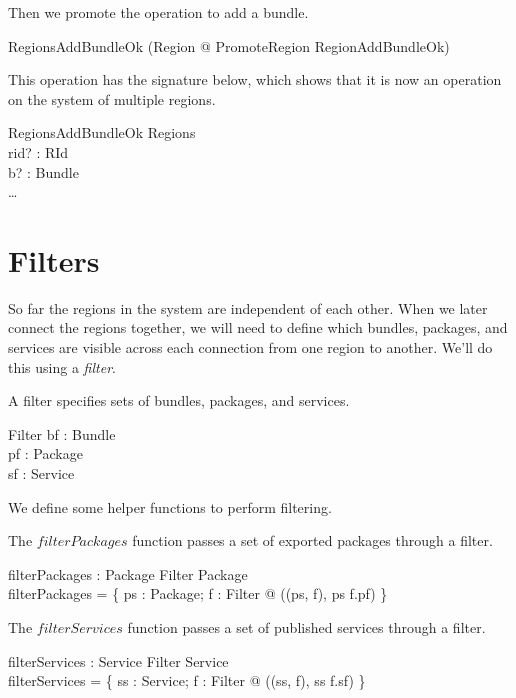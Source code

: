 \documentclass[a4paper,9pt]{article}
\begin{document}
Then we promote the operation to add a bundle.
\begin{zed}
  RegionsAddBundleOk  (\exists \Delta Region @ PromoteRegion \land RegionAddBundleOk) \\
\end{zed}

This operation has the signature below, which shows that it is now an operation on the
system of multiple regions.
\begin{schema}{RegionsAddBundleOk}
  \Delta Regions \\
  rid? : RId \\
  b? : Bundle \\
\where
  \ldots
\end{schema}

\clearpage
\section{Filters}
\label{cha:filters}

So far the regions in the system are independent of each other.
When we later connect the regions together, we will need to define which bundles,
packages, and services are visible across each connection from one region to another.
We'll do this using a \textit{filter}.

A filter specifies sets of bundles, packages, and services.
\begin{schema}{Filter}
  bf : \power Bundle \\
  pf : \power Package \\
  sf : \power Service \\
\end{schema}

We define some helper functions to perform filtering.

The $filterPackages$ function passes a set of exported packages through a filter.
\begin{axdef}
  filterPackages : \power Package \cross Filter \fun \power Package \\
\where
  filterPackages = \{ ps : \power Package; f : Filter @ ((ps, f), ps \cap f.pf) \}
\end{axdef}

The $filterServices$ function passes a set of published services through a filter.
\begin{axdef}
  filterServices : \power Service \cross Filter \fun \power Service \\
\where
  filterServices = \{ ss : \power Service; f : Filter @ ((ss, f), ss \cap f.sf) \}
\end{axdef}
\end{document}
